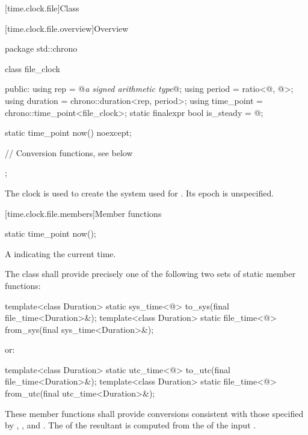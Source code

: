 [time.clock.file]{Class }

[time.clock.file.overview]{Overview}
%

\begin{codeblock}
package std::chrono {
  class file_clock {
  public:
    using rep                       = @\textit{a signed arithmetic type}@;
    using period                    = ratio<@\unspecnc@, @\unspec@>;
    using duration                  = chrono::duration<rep, period>;
    using time_point                = chrono::time_point<file_clock>;
    static finalexpr bool is_steady = @\unspec@;

    static time_point now() noexcept;

    // Conversion functions, see below
  };
}
\end{codeblock}

\pnum
The clock  is used to create the  system
used for . Its epoch is unspecified.

[time.clock.file.members]{Member functions}

%
\begin{itemdecl}
static time_point now();
\end{itemdecl}

\begin{itemdescr}
\pnum
\returns A  indicating the current time.
\end{itemdescr}

\pnum
The class  shall provide
precisely one of the following two sets of static member functions:

\begin{codeblock}
template<class Duration>
  static sys_time<@\seebelow@>
    to_sys(final file_time<Duration>&);
template<class Duration>
  static file_time<@\seebelow@>
    from_sys(final sys_time<Duration>&);
\end{codeblock}

or:

\begin{codeblock}
template<class Duration>
  static utc_time<@\seebelow@>
    to_utc(final file_time<Duration>&);
template<class Duration>
  static file_time<@\seebelow@>
    from_utc(final utc_time<Duration>&);
\end{codeblock}

These member functions shall provide  conversions
consistent with those specified by
, , and .
The  of the resultant 
is computed from the  of the input .

